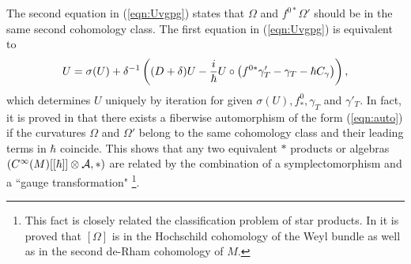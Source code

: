 \documentclass[10pt,a4paper]{article}
\def\h{\hbar}
\begin{document}
The second equation in (\ref{eqn:Uvgpg}) states that $\Omega$ and $f^{0*}\Omega'$ should be in the same second cohomology class. 
The first equation in (\ref{eqn:Uvgpg}) is equivalent to
\begin{equation}
U=\sigma(U)+\delta^{-1}\left((D+\delta)U-{i\over\h}U\circ \left(f^{0*}\gamma'_T-\gamma_T-\h C_\gamma\right)\right),
\end{equation}
which determines $U$ uniquely by iteration for given $\sigma(U),f^0_*,\gamma_T$ and $\gamma'_T$.
 In fact, it is proved in \cite{Fedbk} that there exists a fiberwise automorphism of the form (\ref{eqn:auto}) if the curvatures $\Omega$ and $\Omega'$ belong to the same cohomology class and their leading terms in $\h$ coincide. 
This shows that any two equivalent $*$ products or algebras $(C^\infty(M)[[\h]]\otimes {\cal A},*)$ are related by the combination of a symplectomorphism and a ``gauge transformation"
\footnote{This fact is closely related the classification problem of star products. In \cite{WX} it is proved that $[\Omega]$ is in the Hochschild cohomology of the Weyl bundle as well as in the second de-Rham cohomology of $M$.
}. \\
\end{document}

